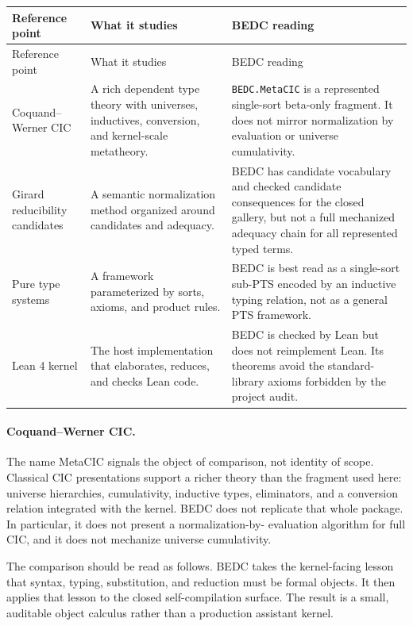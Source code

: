 \begin{longtable}{p{}p{}p{}}
\toprule
Reference point & What it studies & BEDC reading \\
\midrule
\endfirsthead
\toprule
Reference point & What it studies & BEDC reading \\
\midrule
\endhead
Coquand--Werner CIC &
A rich dependent type theory with universes, inductives, conversion, and
kernel-scale metatheory. &
\texttt{BEDC.MetaCIC} is a represented single-sort beta-only fragment.  It
does not mirror normalization by evaluation or universe cumulativity. \\
Girard reducibility candidates &
A semantic normalization method organized around candidates and adequacy. &
BEDC has candidate vocabulary and checked candidate consequences for the
closed gallery, but not a full mechanized adequacy chain for all represented
typed terms. \\
Pure type systems &
A framework parameterized by sorts, axioms, and product rules. &
BEDC is best read as a single-sort sub-PTS encoded by an inductive typing
relation, not as a general PTS framework. \\
Lean 4 kernel &
The host implementation that elaborates, reduces, and checks Lean code. &
BEDC is checked by Lean but does not reimplement Lean.  Its theorems avoid
the standard-library axioms forbidden by the project audit. \\
\bottomrule
\end{longtable}

\paragraph{Coquand--Werner CIC.}
The name MetaCIC signals the object of comparison, not identity of scope.
Classical CIC presentations support a richer theory than the fragment used
here: universe hierarchies, cumulativity, inductive types, eliminators, and a
conversion relation integrated with the kernel.  BEDC does not replicate that
whole package.  In particular, it does not present a normalization-by-
evaluation algorithm for full CIC, and it does not mechanize universe
cumulativity.

The comparison should be read as follows.  BEDC takes the kernel-facing
lesson that syntax, typing, substitution, and reduction must be formal
objects.  It then applies that lesson to the closed self-compilation surface.
The result is a small, auditable object calculus rather than a production
assistant kernel.


